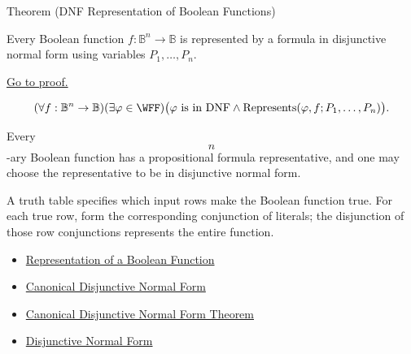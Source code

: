 \begin{theorembox}{Theorem (DNF Representation of Boolean Functions)}
\begin{theorem}
\label{thm:dnf-representation-of-boolean-functions-propositional-logic}
Every Boolean function \(f:\mathbb{B}^n\to\mathbb{B}\) is represented by a
formula in disjunctive normal form using variables \(P_1,\ldots,P_n\).

\noindent\hyperref[prf:dnf-representation-of-boolean-functions-propositional-logic]{Go to proof.}
\end{theorem}
\end{theorembox}

\begin{remark*}
\[
(\forall f:\mathbb{B}^n\to\mathbb{B})(\exists\varphi\in\WFF)
\bigl(\varphi\text{ is in DNF}\land
\operatorname{Represents}(\varphi,f;P_1,\ldots,P_n)\bigr).
\]
\end{remark*}

\begin{remark*}
Every \[
  n
\]-ary Boolean function has a propositional formula representative, and
one may choose the representative to be in disjunctive normal form.
\end{remark*}

\begin{remark*}[Interpretation]
A truth table specifies which input rows make the Boolean function true. For
each true row, form the corresponding conjunction of literals; the disjunction
of those row conjunctions represents the entire function.
\end{remark*}

\begin{dependencies}
\begin{itemize}
  \item \hyperref[def:boolean-function-representation-propositional-logic]{Representation of a Boolean Function}
  \item \hyperref[def:canonical-disjunctive-normal-form-propositional-logic]{Canonical Disjunctive Normal Form}
  \item \hyperref[thm:canonical-disjunctive-normal-form-propositional-logic]{Canonical Disjunctive Normal Form Theorem}
  \item \hyperref[def:disjunctive-normal-form-propositional-logic]{Disjunctive Normal Form}
\end{itemize}
\end{dependencies}
